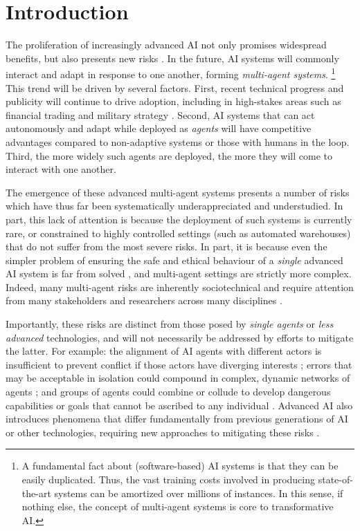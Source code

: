 \section{Introduction}
\label{sec:introduction}


The proliferation of increasingly advanced AI not only promises widespread benefits, but also presents new risks \citep{Bengio2024a,Chan2023-aj}.
In the future, AI systems will commonly interact and adapt in response to one another, forming \emph{multi-agent systems}.%
\footnote{A fundamental fact about (software-based) AI systems is that they can be easily duplicated. Thus, the vast training costs involved in producing state-of-the-art systems can be amortized over millions of instances. In this sense, if nothing else, the concept of multi-agent systems is core to transformative AI.}
This trend will be driven by several factors.
First, recent technical progress and publicity will continue to drive adoption, including in high-stakes areas such as financial trading \citep{Ferreira2021,amplify_aieq,Sun2023_rl_qt} and military strategy \citep{palantir_aip_defense,manson2024ai,Black2024}.
Second, AI systems that can act autonomously and adapt while deployed as \textit{agents} will have competitive advantages compared to non-adaptive systems or those with humans in the loop.
Third, the more widely such agents are deployed, the more they will come to interact with one another.

The emergence of these advanced multi-agent systems presents a number of risks which have thus far been systematically underappreciated and understudied.
In part, this lack of attention is because the deployment of such systems is currently rare, or constrained to highly controlled settings (such as automated warehouses) that do not suffer from the most severe risks.
In part, it is because even the simpler problem of ensuring the safe and ethical behaviour of a \textit{single} advanced AI system is far from solved \citep{Amodei2016,Hendrycks2021,Anwar2024}, and multi-agent settings are strictly more complex.
Indeed, many multi-agent risks are inherently sociotechnical and require attention from many stakeholders and researchers across many disciplines \citep{Curtis2024, Lazar2023}.

Importantly, these risks are distinct from those posed by \textit{single agents} or \textit{less advanced} technologies, and will not necessarily be addressed by efforts to mitigate the latter.
For example:
the alignment of AI agents with different actors is insufficient to prevent conflict if those actors have diverging interests \citep{Sourbut2024,Manheim2019,Dafoe2020,Critch2020,Jagadeesan2023a};
errors that may be acceptable in isolation could compound in complex, dynamic networks of agents \citep{Lee2024,Maas2018,Kirilenko2017,buldyrev2010catastrophic,Sanders2018};
and groups of agents could combine or collude to develop dangerous capabilities or goals that cannot be ascribed to any individual \citep{Jones2024,motwani2024secret,Mogul2006,Calvano2019,Drexler2022}.
Advanced AI also introduces phenomena that differ fundamentally from previous generations of AI or other technologies, requiring new approaches to mitigating these risks \citep{Bengio2024a}.




